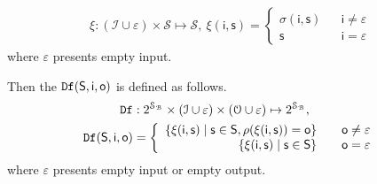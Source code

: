 \begin{equation*}
\begin{split}
\xi :  (\mathcal{I}\cup\varepsilon) \times\mathcal{S} \mapsto\mathcal{S},\ \xi (\mathsf{i}, \mathsf{s})= \left\{
\begin{array}{rcl}
\sigma( \mathsf{i}, \mathsf{s})      &      & {\mathsf{i}\neq \varepsilon}\\
\mathsf{s}       &      & {\mathsf{i}= \varepsilon}
\end{array} \right. 
\end{split}
\end{equation*}
where $\varepsilon$ presents empty input.

Then the ${\tt Df}( \mathsf{S},  \mathsf{i},  \mathsf{o})$ is defined as follows.
\begin{equation}
\begin{split}
{\tt Df}&:2^{\mathcal{S}_{\mathcal{B}}}\times(\mathcal{I}\cup\varepsilon)\times(\mathcal{O}\cup\varepsilon)\mapsto2^{\mathcal{S}_{\mathcal{B}}},\\
{\tt Df}( \mathsf{S},  \mathsf{i},  \mathsf{o})&= \left\{
\begin{array}{rcl}
\{  \xi(\mathsf{i}, \mathsf{s} ) \mid  \mathsf{s} \in \mathsf{S},  \rho(\xi(\mathsf{i}, \mathsf{s} ))=\mathsf{o}\}     &      & {\mathsf{o}\neq \varepsilon}\\
\{  \xi(\mathsf{i}, \mathsf{s} ) \mid  \mathsf{s} \in \mathsf{S}\}       &      & {\mathsf{o}= \varepsilon}
\end{array} \right. 
\end{split}
\end{equation}
where  $\varepsilon$ presents empty input or empty output.

